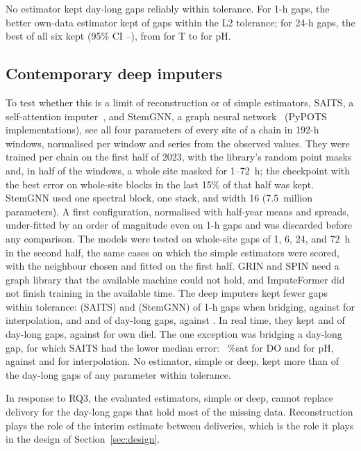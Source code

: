 No estimator kept day-long gaps reliably within tolerance. For 1-h gaps, the better own-data estimator kept \chainTolOneH{} of gaps within the L2 tolerance; for 24-h gaps, the best of all six kept \recDayAll{} (95\% CI \recDayAllLo--\recDayAllHi), from \recDayT{} for T to \recDayPh{} for pH.

\subsection{Contemporary deep imputers}
\label{sec:rec-deep}
To test whether this is a limit of reconstruction or of simple estimators, SAITS, a self-attention imputer~\cite{du2023saits}, and StemGNN, a graph neural network~\cite{cao2020stemgnn} (PyPOTS implementations), see all four parameters of every site of a chain in 192-h windows, normalised per window and series from the observed values. They were trained per chain on the first half of 2023, with the library's random point masks and, in half of the windows, a whole site masked for 1--72~h; the checkpoint with the best error on whole-site blocks in the last 15\% of that half was kept. StemGNN used one spectral block, one stack, and width 16 (7.5~million parameters). A first configuration, normalised with half-year means and spreads, under-fitted by an order of magnitude even on 1-h gaps and was discarded before any comparison. The models were tested on whole-site gaps of 1, 6, 24, and 72~h in the second half, the same \deepGaps{} cases on which the simple estimators were scored, with the neighbour chosen and fitted on the first half. GRIN and SPIN need a graph library that the available machine could not hold, and ImputeFormer did not finish training in the available time. The deep imputers kept fewer gaps within tolerance: \deepBridgeOneSaits{} (SAITS) and \deepBridgeOneStem{} (StemGNN) of 1-h gaps when bridging, against \deepBridgeOneInterp{} for interpolation, and \deepBridgeDaySaits{} and \deepBridgeDayStem{} of day-long gaps, against \deepBridgeDayInterp. In real time, they kept \deepRtDaySaits{} and \deepRtDayStem{} of day-long gaps, against \deepRtDayDiel{} for own diel. The one exception was bridging a day-long gap, for which SAITS had the lower median error: \deepDayDoSaits~\%sat for DO and \deepDayPhSaits{} for pH, against \deepDayDoInterp{} and \deepDayPhInterp{} for interpolation. No estimator, simple or deep, kept more than \deepDayBestAny{} of the day-long gaps of any parameter within tolerance.

In response to RQ3, the evaluated estimators, simple or deep, cannot replace delivery for the day-long gaps that hold most of the missing data. Reconstruction plays the role of the interim estimate between deliveries, which is the role it plays in the design of Section~\ref{sec:design}.
